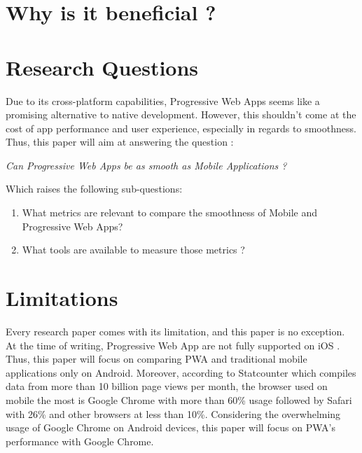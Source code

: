 \documentclass{kththesis}
\begin{document}
\section{Why is it beneficial ?}


\section{Research Questions}

Due to its cross-platform capabilities, Progressive Web Apps seems like a promising alternative to native development. However, this shouldn't come at the cost of app performance and user experience, especially in regards to smoothness.
Thus, this paper will aim at answering the question : 
\begin{center}
    \textit{Can Progressive Web Apps be as smooth as Mobile Applications ?}
\end{center}
Which raises the following sub-questions: 
\begin{enumerate}
    \item What metrics are relevant to compare the smoothness of Mobile and Progressive Web Apps?
    \item What tools are available to measure those metrics ?
\end{enumerate}

\section{Limitations}

Every research paper comes with its limitation, and this paper is no exception. 
At the time of writing, Progressive Web App are not fully supported on iOS \cite{BackgroundSync_support} \cite{Manifest_support}. Thus, this paper will focus on comparing PWA and traditional mobile applications only on Android. 
Moreover, according to Statcounter \cite{Browser_data} which compiles data from more than 10 billion page views per month, the browser used on mobile the most is Google Chrome with more than 60\% usage followed by Safari with 26\% and other browsers at less than 10\%. 
Considering the overwhelming usage of Google Chrome on Android devices, this paper will focus on PWA's performance with Google Chrome. 
\end{document}
